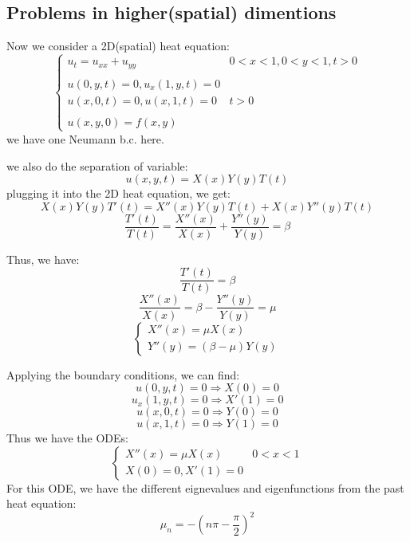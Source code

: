 \documentclass[12pt]{article} %
\begin{document}
\subsection{Problems in higher(spatial) dimentions}
\hspace{5mm}
Now we consider a 2D(spatial) heat equation:
\begin{equation}
\left\{
\begin{array}{lll}
u_{t} = u_{xx} + u_{yy} & 0<x<1, 0<y<1, t>0\\
 \\
 u(0, y, t)=0,  u_{x}(1, y, t)=0 \\
  u(x, 0, t)=0,  u(x, 1, t)=0 & t >0 \\ \\
 u(x, y, 0) = f(x, y)
\end{array}\right.
\end{equation}we have one Neumann b.c. here.
\par
we also do the separation of variable:
$$
u(x, y, t) = X(x)Y(y)T(t)
$$plugging it into the 2D heat equation, we get:
$$
X(x)Y(y)T'(t) = X''(x)Y(y)T(t) + X(x)Y''(y)T(t)
$$
$$
\frac{T'(t)}{T(t)}= \frac{X''(x)}{X(x)}+\frac{Y''(y)}{Y(y)} = \beta
$$\par
Thus, we have:
\begin{equation}
\frac{T'(t)}{T(t)}= \beta
\end{equation}
$$
\frac{X''(x)}{X(x)}= \beta - \frac{Y''(y)}{Y(y)} = \mu
$$
\begin{equation}
\left\{
\begin{array}{lll}
X''(x) = \mu X(x)\\
Y''(y) = (\beta - \mu)Y(y)
\end{array}\right.
\end{equation}\par
Applying the boundary conditions, we can find:
$$
u(0, y, t) = 0 \Rightarrow  X(0) =0
$$
$$
u_{x}(1, y, t) = 0 \Rightarrow X'(1) = 0
$$
$$
u(x, 0, t) = 0 \Rightarrow Y(0) = 0
$$
$$
u(x, 1, t) = 0 \Rightarrow Y(1) = 0
$$
Thus we have the ODEs:
\begin{equation}
\left\{
\begin{array}{lll}
X''(x) = \mu X(x) & 0<x<1\\
X(0) = 0, X'(1) =0 
\end{array}
\right.
\end{equation}
For this ODE, we have the different eignevalues and eigenfunctions from the past heat equation:
\begin{equation}
\mu_{n}= -(n\pi - \frac{\pi}{2})^{2}
\end{equation}
\end{document}
